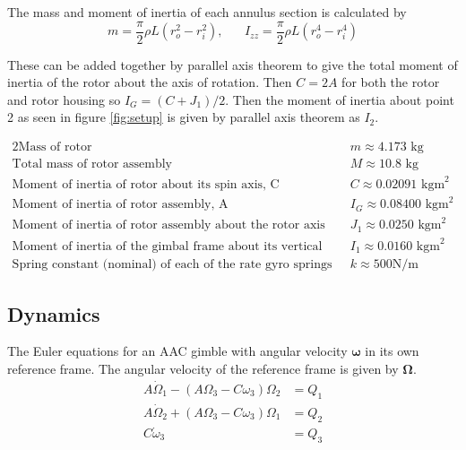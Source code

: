 \documentclass[8pt]{article}
\begin{document}
The mass and moment of inertia of each annulus section is calculated by
\begin{equation}
    m = \frac{\pi}{2} \rho L(r_o^2 - r_i^2), \;\;\;\;\;\; I_{zz} = \frac{\pi}{2} \rho L(r_o^4 - r_i^4)
\end{equation}

These can be added together by parallel axis theorem to give the total moment of inertia of the rotor about the axis of rotation.
Then $C = 2A$ for both the rotor and rotor housing so $I_G = (C + J_1)/2$.
Then the moment of inertia about point 2 as seen in figure \ref{fig:setup} is given by parallel axis theorem as $I_2$.

\begin{alignat}{2}
    \text{Mass of rotor} \;\;\;\; & m \approx 4.173 \text{ kg} \nonumber\\
    \text{Total mass of rotor assembly} \;\;\;\; & M \approx 10.8 \text{ kg} \nonumber\\
    \text{Moment of inertia of rotor about its spin axis, C} \;\;\;\; &  C \approx 0.02091 \text{ kgm}^2 \nonumber \\
    \text{Moment of inertia of rotor assembly, A} \;\;\;\; & I_G \approx 0.08400 \text{ kgm}^2 \nonumber \\
    \text{Moment of inertia of rotor assembly about the rotor axis (excluding rotor)} \;\;\;\; &  J_1 \approx 0.0250 \text{ kgm}^2 \nonumber \\
    \text{Moment of inertia of the gimbal frame about its vertical axis of rotation,} \;\;\;\; &  I_1 \approx 0.0160 \text{ kgm}^2 \nonumber \\
    \text{Spring constant (nominal) of each of the rate gyro springs} \;\;\;\; & k \approx 500 \text{N/m} \nonumber
\end{alignat}

\subsection{Dynamics}

The Euler equations for an AAC gimble with angular velocity $\bm{\omega}$ in its own reference frame.
The angular velocity of the reference frame is given by $\bm{\Omega}$.
\begin{align}
    A\dot{\Omega}_1 - (A\Omega_3 - C \omega_3) \Omega_2 &= Q_1 \\
    A\dot{\Omega}_2 + (A\Omega_3 - C\omega_3) \Omega_1 &= Q_2 \\
    C\dot{\omega}_3 &= Q_3
\end{align}
\end{document}
